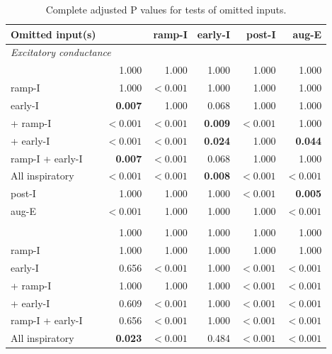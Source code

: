 \begin{table}[htbp]
\centering\small
\caption{Complete adjusted P values for tests of omitted inputs.}
\label{tab:omission_tests}
\begin{tabular}{@{}lrrrrr@{}}
\toprule
Omitted input(s) & \preII{} & ramp-I & early-I & post-I & aug-E \\
\midrule
\multicolumn{6}{l}{\textit{Excitatory conductance}} \\
\addlinespace
\preII{} & 1.000 & 1.000 & 1.000 & 1.000 & 1.000 \\
ramp-I & 1.000 & $\boldsymbol{<0.001}$ & 1.000 & 1.000 & 1.000 \\
early-I & \textbf{0.007} & 1.000 & 0.068 & 1.000 & 1.000 \\
\preII{} + ramp-I & $\boldsymbol{<0.001}$ & $\boldsymbol{<0.001}$ & \textbf{0.009} & $\boldsymbol{<0.001}$ & 1.000 \\
\preII{} + early-I & $\boldsymbol{<0.001}$ & $\boldsymbol{<0.001}$ & \textbf{0.024} & 1.000 & \textbf{0.044} \\
ramp-I + early-I & \textbf{0.007} & $\boldsymbol{<0.001}$ & 0.068 & 1.000 & 1.000 \\
All inspiratory & $\boldsymbol{<0.001}$ & $\boldsymbol{<0.001}$ & \textbf{0.008} & $\boldsymbol{<0.001}$ & $\boldsymbol{<0.001}$ \\
post-I & 1.000 & 1.000 & 1.000 & $\boldsymbol{<0.001}$ & \textbf{0.005} \\
aug-E & $\boldsymbol{<0.001}$ & 1.000 & 1.000 & 1.000 & $\boldsymbol{<0.001}$ \\
\addlinespace
\multicolumn{6}{l}{\textit{Inhibitory conductance}} \\
\addlinespace
\preII{} & 1.000 & 1.000 & 1.000 & 1.000 & 1.000 \\
ramp-I & 1.000 & 1.000 & 1.000 & 1.000 & 1.000 \\
early-I & 0.656 & $\boldsymbol{<0.001}$ & 1.000 & $\boldsymbol{<0.001}$ & $\boldsymbol{<0.001}$ \\
\preII{} + ramp-I & 1.000 & 1.000 & 1.000 & $\boldsymbol{<0.001}$ & $\boldsymbol{<0.001}$ \\
\preII{} + early-I & 0.609 & $\boldsymbol{<0.001}$ & 1.000 & $\boldsymbol{<0.001}$ & $\boldsymbol{<0.001}$ \\
ramp-I + early-I & 0.656 & $\boldsymbol{<0.001}$ & 1.000 & $\boldsymbol{<0.001}$ & $\boldsymbol{<0.001}$ \\
All inspiratory & \textbf{0.023} & $\boldsymbol{<0.001}$ & 0.484 & $\boldsymbol{<0.001}$ & $\boldsymbol{<0.001}$ \\

\end{tabular}
\end{table}
